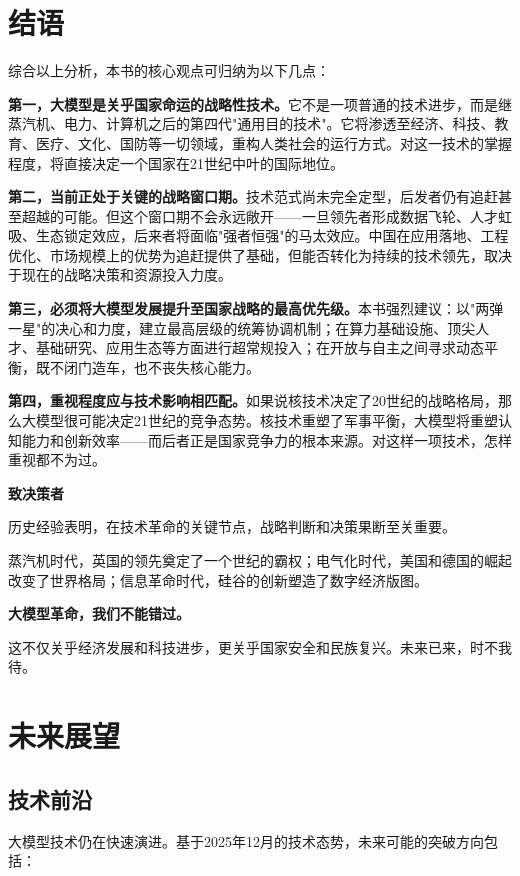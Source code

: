 \section{结语}

综合以上分析，本书的核心观点可归纳为以下几点：

\textbf{第一，大模型是关乎国家命运的战略性技术。}它不是一项普通的技术进步，而是继蒸汽机、电力、计算机之后的第四代"通用目的技术"。它将渗透至经济、科技、教育、医疗、文化、国防等一切领域，重构人类社会的运行方式。对这一技术的掌握程度，将直接决定一个国家在21世纪中叶的国际地位。

\textbf{第二，当前正处于关键的战略窗口期。}技术范式尚未完全定型，后发者仍有追赶甚至超越的可能。但这个窗口期不会永远敞开——一旦领先者形成数据飞轮、人才虹吸、生态锁定效应，后来者将面临"强者恒强"的马太效应。中国在应用落地、工程优化、市场规模上的优势为追赶提供了基础，但能否转化为持续的技术领先，取决于现在的战略决策和资源投入力度。

\textbf{第三，必须将大模型发展提升至国家战略的最高优先级。}本书强烈建议：以"两弹一星"的决心和力度，建立最高层级的统筹协调机制；在算力基础设施、顶尖人才、基础研究、应用生态等方面进行超常规投入；在开放与自主之间寻求动态平衡，既不闭门造车，也不丧失核心能力。

\textbf{第四，重视程度应与技术影响相匹配。}如果说核技术决定了20世纪的战略格局，那么大模型很可能决定21世纪的竞争态势。核技术重塑了军事平衡，大模型将重塑认知能力和创新效率——而后者正是国家竞争力的根本来源。对这样一项技术，怎样重视都不为过。

\textbf{致决策者}

历史经验表明，在技术革命的关键节点，战略判断和决策果断至关重要。

蒸汽机时代，英国的领先奠定了一个世纪的霸权；电气化时代，美国和德国的崛起改变了世界格局；信息革命时代，硅谷的创新塑造了数字经济版图。

\textbf{大模型革命，我们不能错过。}

这不仅关乎经济发展和科技进步，更关乎国家安全和民族复兴。未来已来，时不我待。

\section{未来展望}

\subsection{技术前沿}

大模型技术仍在快速演进。基于2025年12月的技术态势，未来可能的突破方向包括：

